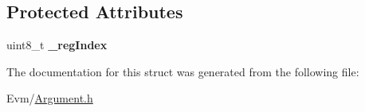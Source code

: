 \subsection*{Protected Attributes}
\begin{DoxyCompactItemize}
\item 
\mbox{\label{struct_evm_1_1_argument_1_1_i_register_base_argument_ab0692f6f7e062fe12d3bcaf70f722805}} 
uint8\+\_\+t {\bfseries \+\_\+reg\+Index}
\end{DoxyCompactItemize}


The documentation for this struct was generated from the following file\+:\begin{DoxyCompactItemize}
\item 
Evm/\mbox{\hyperlink{_argument_8h}{Argument.\+h}}\end{DoxyCompactItemize}
